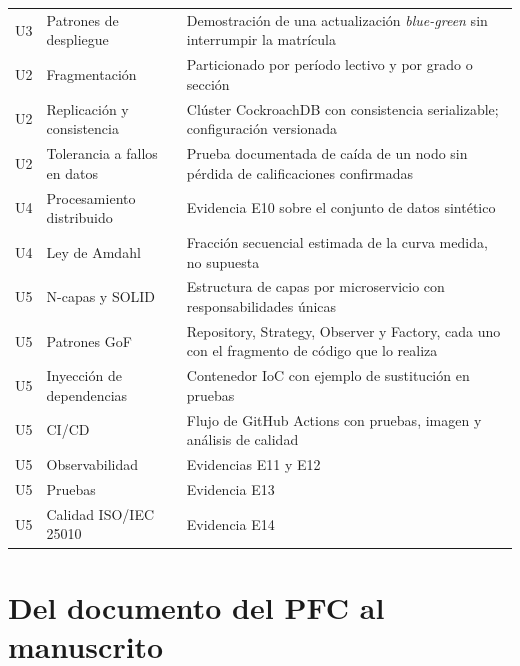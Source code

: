 \documentclass[11pt,a4paper]{article}
\begin{document}
\begin{center}
\begin{longtable}{@{}p{1.2cm}p{5.2cm}p{8.4cm}@{}}
		U3 & Patrones de despliegue & Demostración de una actualización \emph{blue-green} sin interrumpir la matrícula \\
		\addlinespace
		U2 & Fragmentación & Particionado por período lectivo y por grado o sección \\
		U2 & Replicación y consistencia & Clúster CockroachDB con consistencia serializable; configuración versionada \\
		U2 & Tolerancia a fallos en datos & Prueba documentada de caída de un nodo sin pérdida de calificaciones confirmadas \\
		\addlinespace
		U4 & Procesamiento distribuido & Evidencia E10 sobre el conjunto de datos sintético \\
		U4 & Ley de Amdahl & Fracción secuencial estimada de la curva medida, no supuesta \\
		\addlinespace
		U5 & N-capas y SOLID & Estructura de capas por microservicio con responsabilidades únicas \\
		U5 & Patrones GoF & Repository, Strategy, Observer y Factory, cada uno con el fragmento de código que lo realiza \\
		U5 & Inyección de dependencias & Contenedor IoC con ejemplo de sustitución en pruebas \\
		U5 & CI/CD & Flujo de GitHub Actions con pruebas, imagen y análisis de calidad \\
		U5 & Observabilidad & Evidencias E11 y E12 \\
		U5 & Pruebas & Evidencia E13 \\
		U5 & Calidad ISO/IEC 25010 & Evidencia E14 \\
		\bottomrule
	\end{longtable}
\end{center}

\section{Del documento del PFC al manuscrito}
\end{document}
